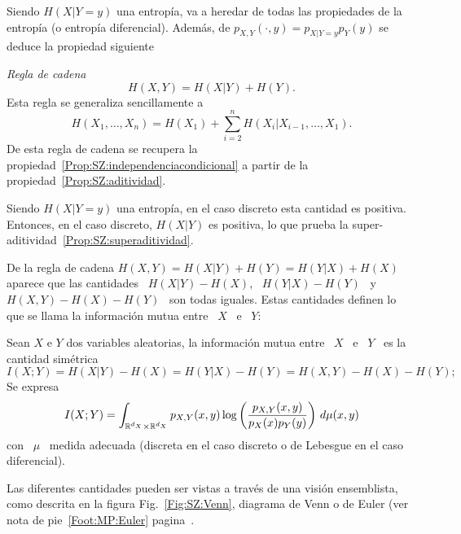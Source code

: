 Siendo $H(X|Y=y)$  una entrop\'ia, va a  heredar de todas las  propiedades de la
entrop\'ia  (o  entrop\'ia   diferencial).   Adem\'as,  de  $p_{X,Y}(\cdot,y)  =
p_{X|Y=y} p_Y(y)$ se deduce la propiedad siguiente
%
\begin{propiedades}
\item\label{Prop:SZ:cadena}  {\it Regla de  cadena}
  \[
  H(X,Y) =  H(X|Y) +  H(Y).
  \]
  Esta regla
  se generaliza sencillamente a
  \[
  H(X_1 , \ldots , X_n) = H(X_1) + \sum_{i=2}^n H(X_i|X_{i-1} , \ldots , X_1).
  \]
  De       esta       regla      de       cadena       se      recupera       la
  propiedad~\ref{Prop:SZ:independenciacondicional}     a     partir    de     la
  propiedad~\ref{Prop:SZ:aditividad}.
\end{propiedades}
%
Siendo  $H(X|Y=y)$  una  entrop\'ia,  en  el  caso  discreto  esta  cantidad  es
positiva. Entonces, en el caso discreto,  $H(X|Y)$ es positiva, lo que prueba la
super-aditividad~\ref{Prop:SZ:superaditividad}.

De la regla de  cadena $H(X,Y) = H(X|Y) + H(Y) = H(Y|X)  + H(X)$ aparece que las
cantidades \ $H(X|Y)-H(X)$, \  $H(Y|X)-H(Y)$ \ y \ $H(X,Y) - H(X)  - H(Y)$ \ son
todas iguales. Estas  cantidades definen lo que se  llama la informaci\'on mutua
entre \ $X$ \ e \ $Y$:

\begin{definicion}\label{Def:SZ:mutua}
  Sean $X$ e $Y$ dos variables  aleatorias, la informaci\'on mutua entre \ $X$ \
  e  \ $Y$ \  es la  cantidad sim\'etrica
  \[
  I(X;Y) = H(X|Y)-H(X) = H(Y|X)-H(Y) = H(X,Y) - H(X) - H(Y);
  \]
  Se expresa
  \[
  I(X;Y)  =  \int_{\mathbb{R}^{d_X}  \times  \mathbb{R}^{d_X}}  p_{X,Y}(x,y)  \log  \left(
    \frac{p_{X,Y}(x,y)}{p_X(x) p_Y(y)} \right) \, d\mu(x,y)
  \]
  con \ $\mu$ \  medida adecuada (discreta en el caso discreto  o de Lebesgue en
  el caso diferencial).
\end{definicion}

Las  diferentes  cantidades  pueden  ser  vistas  a  trav\'es  de  una  visi\'on
ensemblista, como descrita en la figura Fig.~\ref{Fig:SZ:Venn}, diagrama de Venn
o de Euler (ver nota de pie~\ref{Foot:MP:Euler} pagina~\pageref{Foot:MP:Euler}.

